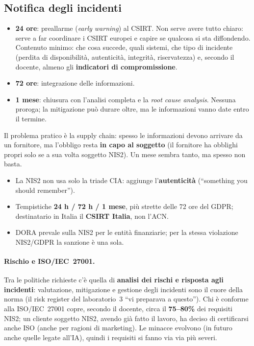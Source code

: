 \subsection{Notifica degli incidenti}
\begin{itemize}
  \item \textbf{24 ore}: preallarme (\emph{early warning}) al CSIRT. Non serve avere tutto chiaro:
    serve a far coordinare i CSIRT europei e capire se qualcosa si sta diffondendo. Contenuto minimo:
    che cosa succede, quali sistemi, che tipo di incidente (perdita di disponibilità, autenticità,
    integrità, riservatezza) e, secondo il docente, almeno gli \textbf{indicatori di compromissione}.
  \item \textbf{72 ore}: integrazione delle informazioni.
  \item \textbf{1 mese}: chiusura con l'analisi completa e la \emph{root cause analysis}. Nessuna
    proroga; la mitigazione può durare oltre, ma le informazioni vanno date entro il termine.
\end{itemize}
Il problema pratico è la supply chain: spesso le informazioni devono arrivare da un fornitore, ma
l'obbligo resta \textbf{in capo al soggetto} (il fornitore ha obblighi propri solo se a sua volta
soggetto NIS2). Un mese sembra tanto, ma spesso non basta.

\begin{esame}
\begin{itemize}
  \item La NIS2 non usa solo la triade CIA: aggiunge l'\textbf{autenticità} (``something you should
    remember'').
  \item Tempistiche \textbf{24 h / 72 h / 1 mese}, più strette delle 72 ore del GDPR; destinatario in
    Italia il \textbf{CSIRT Italia}, non l'ACN.
  \item DORA prevale sulla NIS2 per le entità finanziarie; per la stessa violazione NIS2/GDPR la
    sanzione è una sola.
\end{itemize}
\end{esame}

\paragraph{Rischio e ISO/IEC~27001.} Tra le politiche richieste c'è quella di \textbf{analisi dei rischi e
risposta agli incidenti}: valutazione, mitigazione e gestione degli incidenti sono il cuore della norma
(il risk register del laboratorio~3 ``vi preparava a questo''). Chi è conforme alla ISO/IEC~27001 copre,
secondo il docente, circa il \textbf{75--80\%} dei requisiti NIS2; un cliente soggetto NIS2, avendo già
fatto il lavoro, ha deciso di certificarsi anche ISO (anche per ragioni di marketing). Le minacce
evolvono (in futuro anche quelle legate all'IA), quindi i requisiti si fanno via via più severi.

